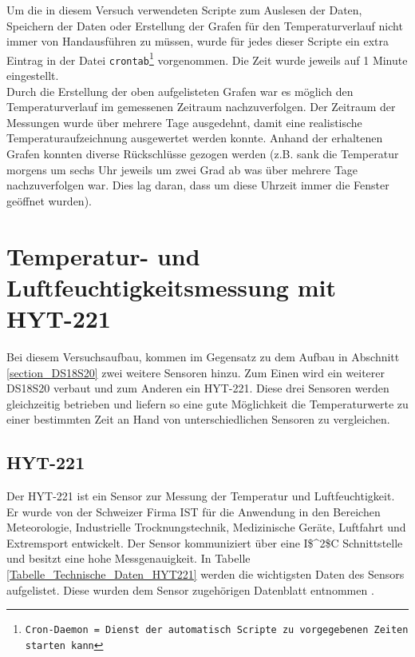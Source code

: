 Um die in diesem Versuch verwendeten Scripte zum Auslesen der Daten, Speichern der Daten oder Erstellung der Grafen für den Temperaturverlauf nicht immer von \glqq Hand\grqq ausführen zu müssen, wurde für jedes dieser Scripte ein extra Eintrag in der Datei \texttt{crontab\footnote{Cron-Daemon = Dienst der automatisch Scripte zu vorgegebenen Zeiten starten kann}} vorgenommen. Die Zeit wurde jeweils auf 1 Minute eingestellt.\\
Durch die Erstellung der oben aufgelisteten Grafen war es möglich den Temperaturverlauf im gemessenen Zeitraum nachzuverfolgen. Der Zeitraum der Messungen wurde über mehrere Tage ausgedehnt, damit eine realistische Temperaturaufzeichnung ausgewertet werden konnte. Anhand der erhaltenen Grafen konnten diverse Rückschlüsse gezogen werden (z.B. sank die Temperatur morgens um sechs Uhr jeweils um zwei Grad ab was über mehrere Tage nachzuverfolgen war. Dies lag daran, dass um diese Uhrzeit immer die Fenster geöffnet wurden).\\



\section{Temperatur- und Luftfeuchtigkeitsmessung mit HYT-221}
\label{section_HTY221}
Bei diesem Versuchsaufbau, kommen im Gegensatz zu dem Aufbau in Abschnitt \ref{section_DS18S20} zwei weitere Sensoren hinzu. Zum Einen wird ein weiterer DS18S20 verbaut und zum Anderen ein HYT-221. Diese drei Sensoren werden gleichzeitig betrieben und liefern so eine gute Möglichkeit die Temperaturwerte zu einer bestimmten Zeit an Hand von unterschiedlichen Sensoren zu vergleichen.
\subsection{HYT-221}
\label{subsection_HYT221}
Der HYT-221 ist ein Sensor zur Messung der Temperatur und Luftfeuchtigkeit. Er wurde von der Schweizer Firma \ac{IST} für die Anwendung in den Bereichen Meteorologie, Industrielle Trocknungstechnik, Medizinische Geräte, Luftfahrt und Extremsport entwickelt. Der Sensor kommuniziert über eine \ac{I$^2$C} Schnittstelle und besitzt eine hohe Messgenauigkeit. In Tabelle \ref{Tabelle_Technische_Daten_HYT221}  werden die wichtigsten Daten des Sensors aufgelistet. Diese wurden dem Sensor zugehörigen Datenblatt entnommen \citep{Datenblatt_HYT221}.

